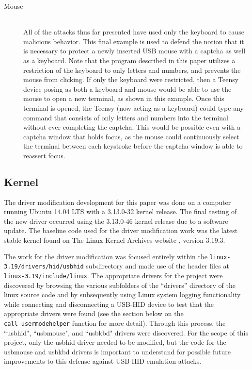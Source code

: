 \documentclass[pagenumbers]{ieee}
\begin{document}
\begin{description}
\item[Mouse] \hfill \\
All of the attacks thus far presented have used only the keyboard to cause malicious behavior. This final example is used to defend the notion that it is necessary to protect a newly inserted USB mouse with a captcha as well as a keyboard. Note that the program described in this paper utilizes a restriction of the keyboard to only letters and numbers, and prevents the mouse from clicking.  If only the keyboard were restricted, then a Teensy device posing as both a keyboard and mouse would be able to use the mouse to open a new terminal, as shown in this example. Once this terminal is opened, the Teensy (now acting as a keyboard) could type any command that consists of only letters and numbers into the terminal without ever completing the captcha. This would be possible even with a captcha window that holds focus, as the mouse could continuously select the terminal between each keystroke before the captcha window is able to reassert focus.
\end{description}


\subsection{Kernel}
\label{section:kernel}

The driver modification development for this paper was done on a computer running Ubuntu 14.04 LTS with a 3.13.0-32 kernel release. The final testing of the new driver occurred using the 3.13.0-46 kernel release due to a software update. The baseline code used for the driver modification work was the latest stable kernel found on The Linux Kernel Archives website \cite{kernel}, version 3.19.3. 

The work for the driver modification was focused entirely within the \texttt{linux-3.19/drivers/hid/usbhid} subdirectory and made use of the header files at \texttt{linux-3.19/include/linux}. The appropriate drivers for the project were discovered by browsing the various subfolders of the ``drivers'' directory of the linux source code and by subsequently using Linux system logging functionality while connecting and disconnecting a USB-HID device to test that the appropriate drivers were found (see the section below on the \texttt{call\_usermodehelper} function for more detail). Through this process, the ``usbhid", ``usbmouse", and ``usbkbd" drivers were discovered. For the scope of this project, only the usbhid driver needed to be modified, but the code for the usbmouse and usbkbd drivers is important to understand for possible future improvements to this defense against USB-HID emulation attacks.
\end{document}
